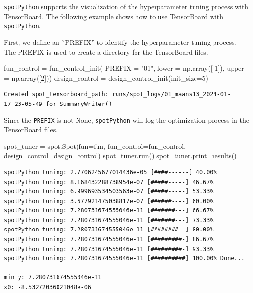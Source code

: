 \documentclass[
  letterpaper,
  DIV=11,
  numbers=noendperiod]{scrreprt}
\newenvironment{Shaded}{\begin{snugshade}}{\end{snugshade}}
\newcommand{\DecValTok}[1]{\textcolor[rgb]{0.68,0.00,0.00}{#1}}
\newcommand{\NormalTok}[1]{\textcolor[rgb]{0.00,0.23,0.31}{#1}}
\newcommand{\OperatorTok}[1]{\textcolor[rgb]{0.37,0.37,0.37}{#1}}
\newcommand{\StringTok}[1]{\textcolor[rgb]{0.13,0.47,0.30}{#1}}
\begin{document}
\texttt{spotPython} supports the visualization of the hyperparameter
tuning process with TensorBoard. The following example shows how to use
TensorBoard with \texttt{spotPython}.

First, we define an ``PREFIX'' to identify the hyperparameter tuning
process. The PREFIX is used to create a directory for the TensorBoard
files.

\begin{Shaded}
\begin{Highlighting}[]
\NormalTok{fun\_control }\OperatorTok{=}\NormalTok{ fun\_control\_init(}
\NormalTok{    PREFIX }\OperatorTok{=} \StringTok{"01"}\NormalTok{,}
\NormalTok{    lower }\OperatorTok{=}\NormalTok{ np.array([}\OperatorTok{{-}}\DecValTok{1}\NormalTok{]),}
\NormalTok{    upper }\OperatorTok{=}\NormalTok{ np.array([}\DecValTok{2}\NormalTok{]))}
\NormalTok{design\_control }\OperatorTok{=}\NormalTok{ design\_control\_init(init\_size}\OperatorTok{=}\DecValTok{5}\NormalTok{)}
\end{Highlighting}
\end{Shaded}

\begin{verbatim}
Created spot_tensorboard_path: runs/spot_logs/01_maans13_2024-01-17_23-05-49 for SummaryWriter()
\end{verbatim}

Since the \texttt{PREFIX} is not None, \texttt{spotPython} will log the
optimization process in the TensorBoard files.

\begin{Shaded}
\begin{Highlighting}[]
\NormalTok{spot\_tuner }\OperatorTok{=}\NormalTok{ spot.Spot(fun}\OperatorTok{=}\NormalTok{fun,}
\NormalTok{                   fun\_control}\OperatorTok{=}\NormalTok{fun\_control,}
\NormalTok{                   design\_control}\OperatorTok{=}\NormalTok{design\_control)}
\NormalTok{spot\_tuner.run()}
\NormalTok{spot\_tuner.print\_results()}
\end{Highlighting}
\end{Shaded}

\begin{verbatim}
spotPython tuning: 2.7706245677014436e-05 [####------] 40.00% 
spotPython tuning: 8.168432288738954e-07 [#####-----] 46.67% 
spotPython tuning: 6.999693534503563e-07 [#####-----] 53.33% 
spotPython tuning: 3.677921475038817e-07 [######----] 60.00% 
spotPython tuning: 7.280731674555046e-11 [#######---] 66.67% 
spotPython tuning: 7.280731674555046e-11 [#######---] 73.33% 
spotPython tuning: 7.280731674555046e-11 [########--] 80.00% 
spotPython tuning: 7.280731674555046e-11 [#########-] 86.67% 
spotPython tuning: 7.280731674555046e-11 [#########-] 93.33% 
spotPython tuning: 7.280731674555046e-11 [##########] 100.00% Done...

min y: 7.280731674555046e-11
x0: -8.53272036021048e-06
\end{verbatim}
\end{document}
